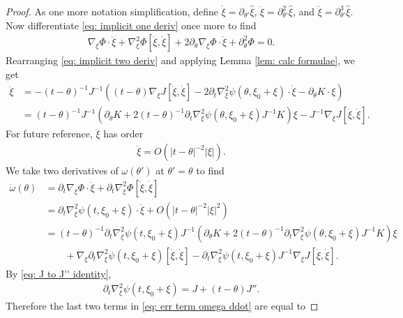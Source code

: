 \documentclass[12pt]{amsart}
\numberwithin{equation}{section}
\newcommand{\1}{\mathbbm{1}}
\newcommand{\xixi}{\xi_0 + \xi}
\begin{document}
\begin{proof}
    As one more notation simplification, define $\dot \xi = \partial_{\theta'} \hat\xi$,  $\ddot \xi = \partial_{\theta'}^2 \hat\xi$, and $\dddot \xi = \partial_{\theta'}^3 \hat\xi$.
    Now differentiate \eqref{eq: implicit one deriv} once more to find 
    \begin{align}\label{eq: implicit two deriv}
        \nabla_\xi \Phi \cdot \ddot \xi + \nabla_\xi^2 \Phi [\dot \xi, \dot \xi] + 2 \partial_\theta \nabla_\xi  \Phi \cdot \dot \xi + \partial_\theta^2 \Phi = 0. 
    \end{align}
    Rearranging \eqref{eq: implicit two deriv} and applying Lemma \ref{lem: calc formulae}, we get
    \begin{align}
        \ddot \xi &= -(t - \theta)^{-1} J^{-1} ((t - \theta) \nabla_\xi J[\dot \xi, \dot \xi] - 2 \partial_t \nabla_\xi^2 \psi(\theta, \xixi) \cdot \dot \xi - \partial_\theta K \cdot \xi) \\
        &= (t - \theta)^{-1} J^{-1} (\partial_\theta K + 2(t - \theta)^{-1} \partial_t \nabla_\xi^2 \psi(\theta, \xixi) J^{-1} K)\xi - J^{-1} \nabla_\xi J[\dot \xi, \dot \xi].
    \end{align}
    For future reference, $\ddot \xi$ has order 
    \begin{align}
        \ddot \xi = O(|t - \theta|^{-2} |\xi|).
    \end{align}
    We take two derivatives of $\omega(\theta')$ at $\theta' = \theta$ to find 
    \begin{align}
        \ddot \omega(\theta) &= \partial_t \nabla_\xi \Phi \cdot \ddot \xi + \partial_t \nabla_\xi^2 \Phi[\dot \xi, \dot \xi] \\
        &= \partial_t \nabla_\xi^2 \psi(t, \xixi) \cdot \ddot \xi + O(|t - \theta|^{-2} |\xi|^2) \\
        &= (t - \theta)^{-1} \partial_t \nabla_\xi^2 \psi(t, \xixi) J^{-1}(\partial_\theta K + 2(t - \theta)^{-1} \partial_t \nabla_\xi^2 \psi(\theta, \xixi) J^{-1} K)\xi \\ & \qquad+ \nabla_\xi \partial_t \nabla_\xi^2 \psi(t,\xixi)[\dot \xi, \dot \xi] - \partial_t \nabla_\xi^2 \psi(t,\xixi) J^{-1} \nabla_\xi J[\dot \xi, \dot \xi].\label{eq: err term omega ddot}
    \end{align}
    By \eqref{eq: J to J'' identity},
    \begin{align}
        \partial_t \nabla_\xi^2 \psi(t,\xixi) = J + (t-\theta)J''.
    \end{align}
    Therefore the last two terms in \eqref{eq: err term omega ddot} are equal to 

\end{proof}
\end{document}
